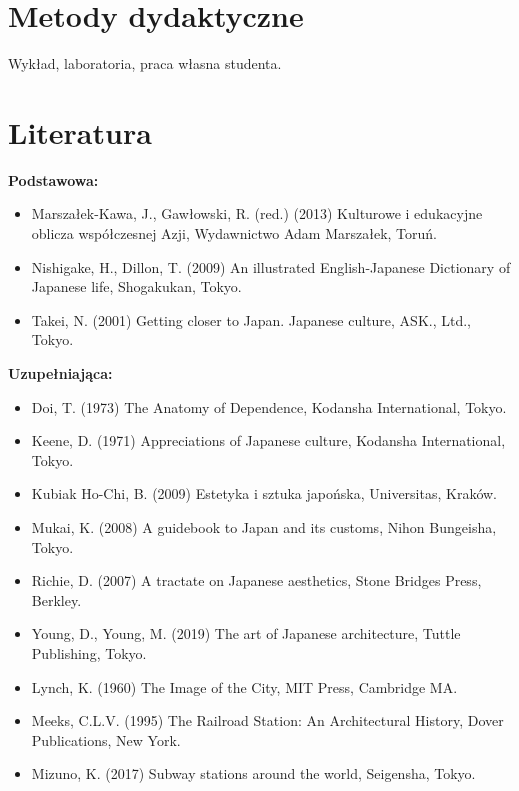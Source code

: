 \documentclass[12pt, a4paper]{article}
\begin{document}
\section{Metody dydaktyczne}

Wykład, laboratoria, praca własna studenta.

\section{Literatura}

\textbf{Podstawowa:}
\begin{itemize}
  \item Marszałek-Kawa, J., Gawłowski, R. (red.) (2013) Kulturowe i edukacyjne oblicza współczesnej Azji, Wydawnictwo Adam Marszałek, Toruń.
  \item Nishigake, H., Dillon, T. (2009) An illustrated English-Japanese Dictionary of Japanese life, Shogakukan, Tokyo.
  \item Takei, N. (2001) Getting closer to Japan. Japanese culture, ASK., Ltd., Tokyo.
\end{itemize}

\textbf{Uzupełniająca:}
\begin{itemize}
  \item Doi, T. (1973) The Anatomy of Dependence, Kodansha International, Tokyo.
  \item Keene, D. (1971) Appreciations of Japanese culture, Kodansha International, Tokyo.
  \item Kubiak Ho-Chi, B. (2009) Estetyka i sztuka japońska, Universitas, Kraków.
  \item Mukai, K. (2008) A guidebook to Japan and its customs, Nihon Bungeisha, Tokyo.
  \item Richie, D. (2007) A tractate on Japanese aesthetics, Stone Bridges Press, Berkley.
  \item Young, D., Young, M. (2019) The art of Japanese architecture, Tuttle Publishing, Tokyo.
  \item Lynch, K. (1960) The Image of the City, MIT Press, Cambridge MA.
  \item Meeks, C.L.V. (1995) The Railroad Station: An Architectural History, Dover Publications, New York.
  \item Mizuno, K. (2017) Subway stations around the world, Seigensha, Tokyo.
\end{itemize}
\end{document}
